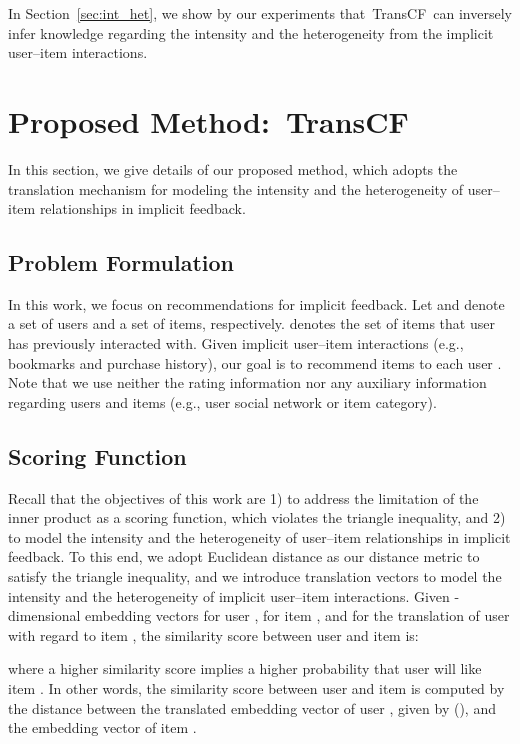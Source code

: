 \documentclass[conference]{IEEEtran}
\newcommand{\propose}{\textsf{{TransCF}}}
\begin{document}
In Section~\ref{sec:int_het}, we show by our experiments that~\propose~can inversely infer knowledge regarding the intensity and the heterogeneity from the implicit user--item interactions.


\section{Proposed Method:~\textsf{T}\lowercase{\textsf{rans}}\textsf{CF}}
In this section, we give details of our proposed method, which adopts the translation mechanism for modeling the intensity and the heterogeneity of user--item relationships in implicit feedback.

\subsection{Problem Formulation}
In this work, we focus on recommendations for implicit feedback. 
Let  and  denote a set of users and a set of items, respectively.
 denotes the set of items that user  has previously interacted with.
Given implicit user--item interactions (e.g., bookmarks and purchase history), our goal is to recommend items  to each user . Note that we use neither the rating information nor any auxiliary information regarding users and items (e.g., user social network or item category). 



\subsection{Scoring Function}
Recall that the objectives of this work are 1) to address the limitation of the inner product as a scoring function, which violates the triangle inequality, and 2) to model the intensity and the heterogeneity of user--item relationships in implicit feedback. To this end, we adopt Euclidean distance as our distance metric to satisfy the triangle inequality, and we introduce translation vectors to model the intensity and the heterogeneity of implicit user--item interactions. Given -dimensional embedding vectors  for user ,  for item , and  for the translation of user  with regard to item , the similarity score  between user  and item  is:
	
where a higher similarity score  implies a higher probability that user  will like item .
In other words, the similarity score between user  and item  is computed by the distance between the translated embedding vector of user , given by (), and the embedding vector  of item .
\end{document}
